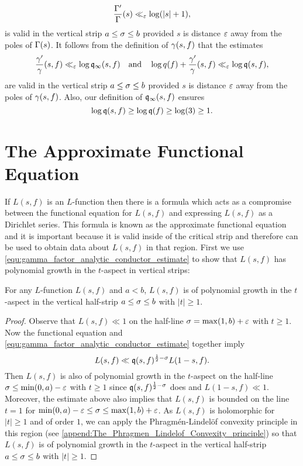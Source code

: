     \[
      \frac{\Gamma'}{\Gamma}(s) \ll_{\varepsilon} \log(|s|+1),
    \]
    is valid in the vertical strip $a \le \sigma \le b$ provided $s$ is distance $\varepsilon$ away from the poles of $\Gamma(s)$. It follows from the definition of $\gamma(s,f)$ that the estimates
    \begin{equation}\label{equ:digamma_gamma_factor_analytic_conductor_estimate}
      \frac{\gamma'}{\gamma}(s,f) \ll_{\varepsilon} \log\mathfrak{q}_{\infty}(s,f) \quad \text{and} \quad \log{q(f)}+\frac{\gamma'}{\gamma}(s,f) \ll_{\varepsilon} \log\mathfrak{q}(s,f),
    \end{equation}
    are valid in the vertical strip $a \le \sigma \le b$ provided $s$ is distance $\varepsilon$ away from the poles of $\gamma(s,f)$. Also, our definition of $\mathfrak{q}_{\infty}(s,f)$ ensures
    \[
      \log\mathfrak{q}(s,f) \ge \log\mathfrak{q}(f) \ge \log(3) \ge 1.
    \]
  \section{The Approximate Functional Equation}
    If $L(s,f)$ is an $L$-function then there is a formula which acts as a compromise between the functional equation for $L(s,f)$ and expressing $L(s,f)$ as a Dirichlet series. This formula is known as the approximate functional equation and it is important because it is valid inside of the critical strip and therefore can be used to obtain data about $L(s,f)$ in that region. First we use \cref{equ:gamma_factor_analytic_conductor_estimate} to show that $L(s,f)$ has polynomial growth in the $t$-aspect in vertical strips:

    \begin{proposition}\label{prop:L_function_bounded_in_vertical_strips}
      For any $L$-function $L(s,f)$ and $a < b$, $L(s,f)$ is of polynomial growth in the $t$-aspect in the vertical half-strip $a \le \sigma \le b$ with $|t| \ge 1$.
    \end{proposition}
    \begin{proof}
      Observe that $L(s,f) \ll 1$ on the half-line $\sigma = \max(1,b)+\varepsilon$ with $t \ge 1$. Now the functional equation and \cref{equ:gamma_factor_analytic_conductor_estimate} together imply
      \[
        L(s,f) \ll \mathfrak{q}(s,f)^{\frac{1}{2}-\sigma}L(1-s,f).
      \]
      Then $L(s,f)$ is also of polynomial growth in the $t$-aspect on the half-line $\sigma \le \min(0,a)-\varepsilon$ with $t \ge 1$ since $\mathfrak{q}(s,f)^{\frac{1}{2}-\sigma}$ does and $L(1-s,f) \ll 1$. Moreover, the estimate above also implies that $L(s,f)$ is bounded on the line $t = 1$ for $\min(0,a)-\varepsilon \le \sigma \le \max(1,b)+\varepsilon$. As $L(s,f)$ is holomorphic for $|t| \ge 1$ and of order $1$, we can apply the Phragm\'en-Lindel\"of convexity principle in this region (see \cref{append:The_Phragmen_Lindelof_Convexity_principle}) so that $L(s,f)$ is of polynomial growth in the $t$-aspect in the vertical half-strip $a \le \sigma \le b$ with $|t| \ge 1$.
    \end{proof}

